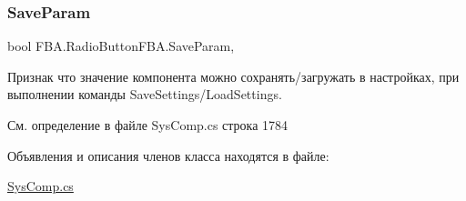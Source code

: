 \subsubsection{\texorpdfstring{Save\+Param}{SaveParam}}
{\footnotesize\ttfamily bool F\+B\+A.\+Radio\+Button\+F\+B\+A.\+Save\+Param\hspace{0.3cm}{\ttfamily [get]}, {\ttfamily [set]}}



Признак что значение компонента можно сохранять/загружать в настройках, при выполнении команды Save\+Settings/\+Load\+Settings. 



См. определение в файле Sys\+Comp.\+cs строка 1784



Объявления и описания членов класса находятся в файле\+:\begin{DoxyCompactItemize}
\item 
\mbox{\hyperlink{_sys_comp_8cs}{Sys\+Comp.\+cs}}\end{DoxyCompactItemize}
